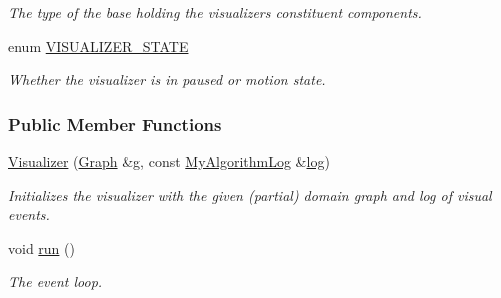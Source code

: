 \begin{DoxyCompactItemize}
\begin{DoxyCompactList}\small\item\em The type of the base holding the visualizer\textquotesingle{}s constituent components. \end{DoxyCompactList}\item 
enum \hyperlink{structslb_1_1core_1_1ui_1_1Visualizer_a38e4b90b6d4faae3c15629f715440ad9}{V\+I\+S\+U\+A\+L\+I\+Z\+E\+R\+\_\+\+S\+T\+A\+TE} \hypertarget{structslb_1_1core_1_1ui_1_1Visualizer_a38e4b90b6d4faae3c15629f715440ad9}{}\label{structslb_1_1core_1_1ui_1_1Visualizer_a38e4b90b6d4faae3c15629f715440ad9}
\begin{DoxyCompactList}\small\item\em Whether the visualizer is in paused or motion state. \end{DoxyCompactList}
\end{DoxyCompactItemize}
\subsubsection*{Public Member Functions}
\begin{DoxyCompactItemize}
\item 
\hyperlink{structslb_1_1core_1_1ui_1_1Visualizer_aae8995972cf6add802cd91c082753d92}{Visualizer} (\hyperlink{structslb_1_1core_1_1ui_1_1Visualizer_ac8db3a9d8995c036199d314358df4d33}{Graph} \&g, const \hyperlink{structslb_1_1core_1_1ui_1_1Visualizer_aa8d54754716436cc1a07935d514f4b53}{My\+Algorithm\+Log} \&\hyperlink{structslb_1_1core_1_1ui_1_1VisualizerData_adc08cfbe1fa989f8e26933a91e71142f}{log})
\begin{DoxyCompactList}\small\item\em Initializes the visualizer with the given (partial) domain graph and log of visual events. \end{DoxyCompactList}\item 
void \hyperlink{structslb_1_1core_1_1ui_1_1Visualizer_a722594690ffebb1bb74d21630a1a232e}{run} ()\hypertarget{structslb_1_1core_1_1ui_1_1Visualizer_a722594690ffebb1bb74d21630a1a232e}{}\label{structslb_1_1core_1_1ui_1_1Visualizer_a722594690ffebb1bb74d21630a1a232e}

\begin{DoxyCompactList}\small\item\em The event loop. \end{DoxyCompactList}\end{DoxyCompactItemize}
